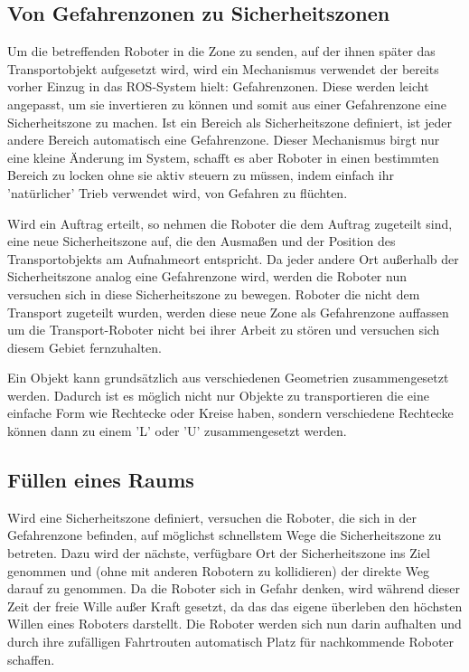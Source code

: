 \subsection*{Von Gefahrenzonen zu Sicherheitszonen}

Um die betreffenden Roboter in die Zone zu senden, auf der ihnen später das Transportobjekt aufgesetzt wird, wird ein Mechanismus verwendet der bereits vorher Einzug in das \ac{ROS}-System hielt: Gefahrenzonen. Diese werden leicht angepasst, um sie invertieren zu können und somit aus einer Gefahrenzone eine Sicherheitszone zu machen. Ist ein Bereich als Sicherheitszone definiert, ist jeder andere Bereich automatisch eine Gefahrenzone.
Dieser Mechanismus birgt nur eine kleine Änderung im System, schafft es aber Roboter in einen bestimmten Bereich zu locken ohne sie aktiv steuern zu müssen, indem einfach ihr 'natürlicher' Trieb verwendet wird, von Gefahren zu flüchten.

Wird ein Auftrag erteilt, so nehmen die Roboter die dem Auftrag zugeteilt sind, eine neue Sicherheitszone auf, die den Ausmaßen und der Position des Transportobjekts am Aufnahmeort entspricht. Da jeder andere Ort außerhalb der Sicherheitszone analog eine Gefahrenzone wird, werden die Roboter nun versuchen sich in diese Sicherheitszone zu bewegen. Roboter die nicht dem Transport zugeteilt wurden, werden diese neue Zone als Gefahrenzone auffassen um die Transport-Roboter nicht bei ihrer Arbeit zu stören und versuchen sich diesem Gebiet fernzuhalten.

Ein Objekt kann grundsätzlich aus verschiedenen Geometrien zusammengesetzt werden. Dadurch ist es möglich nicht nur Objekte zu transportieren die eine einfache Form wie Rechtecke oder Kreise haben, sondern verschiedene Rechtecke können dann zu einem 'L' oder 'U' zusammengesetzt werden.

\subsection*{Füllen eines Raums}

Wird eine Sicherheitszone definiert, versuchen die Roboter, die sich in der Gefahrenzone befinden, auf möglichst schnellstem Wege die Sicherheitszone zu betreten. Dazu wird der nächste, verfügbare Ort der Sicherheitszone ins Ziel genommen und (ohne mit anderen Robotern zu kollidieren) der direkte Weg darauf zu genommen. Da die Roboter sich in Gefahr denken, wird während dieser Zeit der freie Wille außer Kraft gesetzt, da das das eigene überleben den höchsten Willen eines Roboters darstellt. Die Roboter werden sich nun darin aufhalten und durch ihre zufälligen Fahrtrouten automatisch Platz für nachkommende Roboter schaffen.

